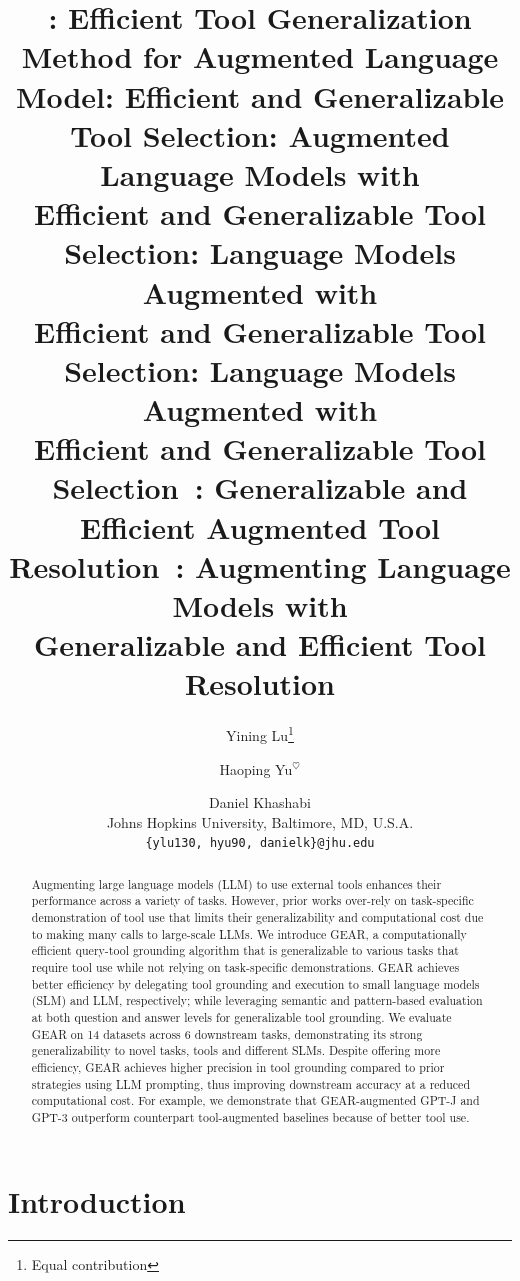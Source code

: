 \documentclass[11pt]{article}
\title{\name: Efficient Tool Generalization Method for Augmented Language Model}
\title{\name: Efficient and Generalizable Tool Selection}
\title{\name: Augmented Language Models with \\ Efficient and Generalizable Tool Selection}
\title{\name: Language Models Augmented with \\ Efficient and Generalizable Tool Selection}
\title{\name: Language Models Augmented with \\ Efficient and Generalizable Tool Selection}
\title{\gear~\name: Generalizable and Efficient Augmented Tool Resolution}
\title{\gear~\name: Augmenting Language Models with \\ 
\hspace{0.2cm}Generalizable and Efficient Tool Resolution}
\author{Yining Lu\thanks{\:\;\;\;Equal contribution} \; \and Haoping Yu$^\heartsuit$ \and Daniel Khashabi \\
       Johns Hopkins University, Baltimore, MD, U.S.A. \\ \texttt{\{ylu130, hyu90, danielk\}@jhu.edu}}
\newcommand{\llm}{\textcolor{darkredTwo}{LLM}}
\newcommand{\slm}{\textcolor{darkblueTwo}{SLM}}
\newcommand{\name}{{\fontfamily{cmss}\selectfont GEAR}}
\newcommand{\gptj}{{\tt \textcolor{darkredTwo}{GPT-J}}}
\newcommand{\gptjText}{{GPT-J}}
\newcommand{\gptDavinciThree}{{\tt \textcolor{darkredTwo}{GPT3$_{\text{davinci-003}}$}}}
\newcommand{\gptNeo}{{\tt \textcolor{darkblueTwo}{GPT-Neo}}}
\newcommand{\gptTwoLarge}{{\tt \textcolor{darkblueTwo}{GPT2$_{\text{large}}$}}}
\newcommand{\gptTwo}{{\tt \textcolor{darkblueTwo}{GPT2$_{\text{medium}}$}}}
\newcommand{\gptThreeText}{{GPT-3}}
\begin{document}
\maketitle
\begin{abstract}
Augmenting large language models (\llm{}) to use external tools enhances their performance across a variety of tasks. 
However, prior works over-rely on task-specific demonstration of tool use that limits their generalizability and computational cost due to making many calls to large-scale \llm{}s.
We introduce \name, a computationally efficient query-tool grounding algorithm that is generalizable to various tasks that require tool use while not relying on task-specific demonstrations.
\name{} achieves better efficiency by delegating tool grounding and execution to small language models (\slm{}) and \llm{}, respectively; while leveraging semantic and pattern-based evaluation at both question and answer levels for generalizable tool grounding. We evaluate \name{} on 14 datasets across 6 downstream tasks, demonstrating its strong generalizability to novel tasks, tools and different \slm{}s. Despite offering more efficiency, \name{} achieves higher precision in tool grounding compared to prior strategies using \llm{} prompting, thus improving downstream accuracy at a reduced computational cost. For example, we demonstrate that \name{}-augmented \gptjText{} and \gptThreeText{} outperform counterpart tool-augmented baselines because of better tool use.
\end{abstract}

\section{Introduction}
\newcommand{\arrowdownright}{\hspace{0.03cm}\reflectbox{\rotatebox[origin=c]{180}{$\Rsh$}}\hspace{0.03cm}}


\end{document}
